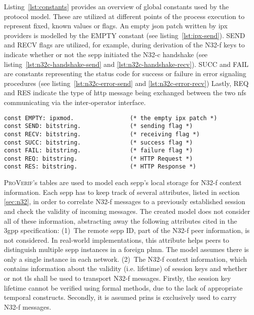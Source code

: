 Listing~\ref{lst:constants} provides an overview of global constants used by the protocol model.
These are utilized at different points of the process execution to represent fixed, known values or flags.
An empty \gls{json} patch written by \gls{ipx} providers is modelled by the {\sffamily EMPTY} constant (see listing~\ref{lst:ipx-send}).
{\sffamily SEND} and {\sffamily RECV} flags are utilized, for example, during derivation of the N32-f keys to indicate whether or not the \gls{sepp} initiated the N32-c handshake (see listing~\ref{lst:n32c-handshake-send} and \ref{lst:n32c-handshake-recv}).
{\sffamily SUCC} and {\sffamily FAIL} are constants representing the status code for success or failure in error signaling procedures (see listing~\ref{lst:n32c-error-send} and \ref{lst:n32c-error-recv})
Lastly, {\sffamily REQ} and {\sffamily RES} indicate the type of \gls{http} message being exchanged between the two \glspl{nf} communicating via the inter-operator interface.

\begin{lstlisting}[caption={Global constant declarations},label={lst:constants},firstnumber=35]
const EMPTY: ipxmod.                (* the empty ipx patch *)
const SEND: bitstring.              (* sending flag *)
const RECV: bitstring.              (* receiving flag *)
const SUCC: bitstring.              (* success flag *)
const FAIL: bitstring.              (* failure flag *)
const REQ: bitstring.               (* HTTP Request *)
const RES: bitstring.               (* HTTP Response *)
\end{lstlisting}

\textsc{ProVerif}'s tables are used to model each \gls{sepp}'s local storage for N32-f context information.
Each \gls{sepp} has to keep track of several attributes, listed in section \ref{sec:n32}, in order to correlate N32-f messages to a previously established session and check the validity of incoming messages.
The created model does not consider all of these information, abstracting away the following attributes cited in the \gls{3gpp} specification:
(1)~The remote \gls{sepp} ID, part of the N32-f peer information, is not considered.
In real-world implementations, this attribute helps peers to distinguish multiple \gls{sepp} instances in a foreign \gls{plmn}.
The model assumes there is only a single instance in each network.
(2)~The N32-f context information, which contains information about the validity (i.e. lifetime) of session keys and whether or not \gls{tls} shall be used to transport N32-f messages.
Firstly, the session key lifetime cannot be verified using formal methods, due to the lack of appropriate temporal constructs.
Secondly, it is assumed \gls{prins} is exclusively used to carry N32-f messages.

